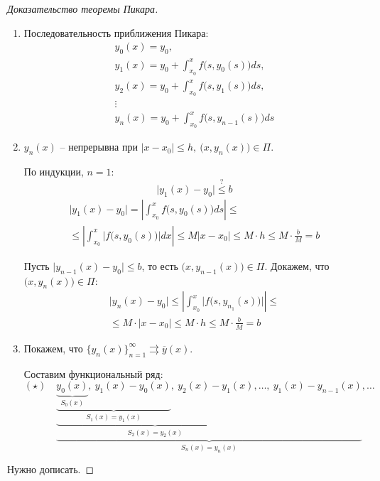 \documentclass[11pt,a4paper,oneside]{report}
\theoremstyle{definition}
\theoremstyle{plain}
\theoremstyle{remark}
\begin{document}
\begin{proof}[Доказательство теоремы Пикара]
    \begin{enumerate}
        \item Последовательность приближения Пикара:
              \begin{equation*}
                  \begin{array}{l}
                      y_0(x) = y_0,                                       \\
                      y_1(x) = y_0 + \int_{x_0}^{x}f\big(s,y_0(s)\big)ds, \\
                      y_2(x) = y_0 + \int_{x_0}^{x}f\big(s,y_1(s)\big)ds, \\
                      \vdots                                              \\
                      y_n(x) = y_0 + \int_{x_0}^{x}f\big(s,y_{n-1}(s)\big)ds
                  \end{array}
              \end{equation*}
        \item $y_n(x)$ -- непрерывна при $|x-x_0| \leqslant h, \ \big(x,y_n(x)\big)\in \Pi$.

              По индукции, $n=1$:
              \begin{equation*}
                  \big|y_1(x) - y_0\big| \overset{?}{\leqslant}b
              \end{equation*}
              \begin{multline*}
                  \big|y_1(x) - y_0\big| = \left|\int_{x_0}^{x}f\big(s,y_0(s)\big)ds\right| \leqslant \\
                  \leqslant \left|\int_{x_0}^{x}\Big|f\big(s,y_0(s)\big)\Big|dx\right| \leqslant M|x - x_0| \leqslant M\cdot h \leqslant M\cdot \frac{b}{M} = b
              \end{multline*}

              Пусть $\big|y_{n-1}(x) - y_0\big|\leqslant b$, то есть $\big(x,y_{n-1}(x)\big)\in \Pi$. Докажем, что $\big(x,y_n(x)\big)\in\Pi$:
              \begin{multline*}
                  \big|y_n(x) - y_0\big| \leqslant \left|\int_{x_0}^{x}\Big|f\big(s,y_{n_1}(s)\big)\Big|\right|\leqslant \\
                  \leqslant M\cdot |x - x_0| \leqslant M\cdot h \leqslant M\cdot \frac{b}{M} = b
              \end{multline*}
        \item Покажем, что $\big\{y_n(x)\big\}^\infty_{n=1} \rightrightarrows \overline{y}(x)$.

              Составим функциональный ряд:
              \begin{equation*}
                  (\star) \quad \underbrace{\underbrace{\underbrace{\underbrace{y_0(x)}_{S_0(x)}, \ y_1(x) - y_0(x)}_{S_1(x) = y_1(x)}, \ y_2(x) - y_1(x)}_{S_2(x) = y_2(x)}, \ldots, \ y_1(x) - y_{n-1}(x)}_{S_n(x) = y_n(x)}, \ldots
              \end{equation*}
    \end{enumerate}

    Нужно дописать.
\end{proof}
\end{document}
